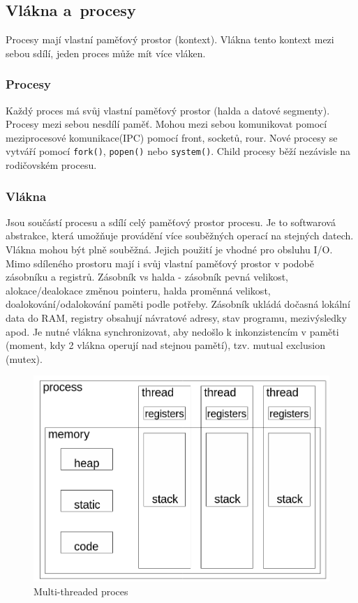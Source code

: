 \subsection{Vlákna a~procesy}
Procesy mají vlastní paměťový prostor (kontext). Vlákna tento kontext mezi sebou sdílí, jeden proces může mít více vláken.

\subsubsection{Procesy}
Každý proces má svůj vlastní paměťový prostor (halda a datové segmenty). Procesy mezi sebou nesdílí paměť. Mohou mezi sebou komunikovat pomocí meziprocesové komunikace(IPC) pomocí front, socketů, rour.  Nové procesy se vytváří pomocí \texttt{fork()}, \texttt{popen()} nebo \texttt{system()}. Child procesy běží nezávisle na rodičovském procesu.

\subsubsection{Vlákna}
Jsou součástí procesu a sdílí celý paměťový prostor procesu. Je to softwarová abstrakce, která umožňuje provádění více souběžných operací na stejných datech. Vlákna mohou být plně souběžná. 
Jejich použití je vhodné pro obsluhu I/O. Mimo sdíleného prostoru mají i svůj vlastní paměťový prostor v podobě zásobníku a registrů. Zásobník vs halda - zásobník pevná velikost, alokace/dealokace změnou pointeru, halda proměnná velikost, doalokování/odalokování paměti podle potřeby. Zásobník ukládá dočasná lokální data do RAM, registry obsahují návratové adresy, stav programu, mezivýsledky apod. Je nutné vlákna synchronizovat, aby nedošlo k inkonzistencím v paměti (moment, kdy 2 vlákna operují nad stejnou pamětí), tzv. mutual exclusion (mutex).
\begin{figure}[ht]
    \centering
    \includegraphics[width=0.5\linewidth]{MPC-PZP/pict/multithread.png}
    \caption{Multi-threaded proces}
\end{figure}

